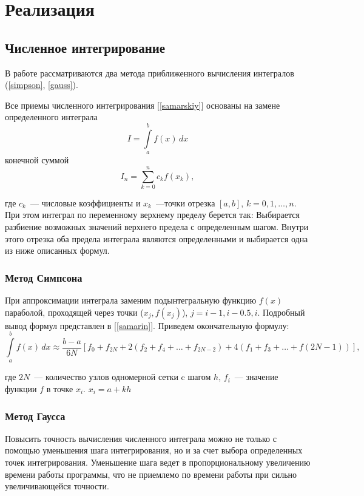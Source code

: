 \chapter{Реализация}
\section{Численное интегрирование}
В работе рассматриваются два метода приближенного вычисления интегралов
(\ref{simpson}, \ref{gauss}).

Все приемы численного интегрирования [\ref{samarskiy}] основаны на  замене определенного интеграла 
\begin{equation}
	I = \int\limits_a^b f(x)\,dx
\end{equation}
конечной суммой
\begin{equation}
	I_n = \sum\limits_{k=0}^n c_k f(x_k),
\end{equation}

где $c_k$~--- числовые коэффициенты и $x_k$~---точки отрезка $[a,b]$, $k=0, 1, \ldots, n$.
При этом интеграл по переменному верхнему пределу берется так: Выбирается разбиение возможных значений верхнего предела
с определенным шагом. Внутри этого отрезка оба предела интеграла являются определенными и выбирается одна из ниже описанных формул.

\subsection{Метод Симпсона\label{simpson}}
При аппроксимации интеграла заменим подынтегральную функцию $f(x)$ параболой, проходящей через точки
($x_j, f(x_j) $), $j=i-1, i-0.5, i$. Подробный вывод формул представлен в [\ref{samarin}]. Приведем окончательную формулу:
\begin{equation}
\int\limits^b_a f(x)\,dx \approx \dfrac{b-a}{6N}\left[f_0 +f_{2N}+2(f_2+f_4+\ldots+f_{2N-2})+4(f_1+f_3+\ldots+f(2N-1))\right],
\end{equation}

где $2N$~--- количество узлов одномерной сетки c шагом $h$, $f_i$~--- значение функции $f$ в точке $x_i$. $x_i = a+kh$

\subsection{Метод Гаусса\label{gauss}}
Повысить точность вычисления численного интеграла можно не только с помощью уменьшения шага интегрирования, но и за счет 
выбора определенных точек интегрирования. Уменьшение шага ведет в пропорциональному увеличению времени работы программы, что не
приемлемо по времени работы при сильно увеличивающейся точности.

